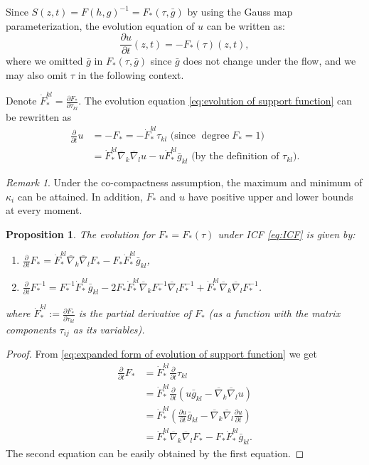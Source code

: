 \documentclass[reqno]{amsart}
\newtheorem{proposition}[theorem]{Proposition}
\theoremstyle{remark}
\newtheorem{remark}[theorem]{Remark}
\newcommand{\pd}[2]{\frac{\partial {#1}}{\partial {#2}}}
\newcommand{\bnabla}{\overline{\nabla}}
\newcommand{\bg}{\bar{g}}
\theoremstyle{definition}
\numberwithin{equation}{section}
\begin{document}
Since \(S(z,t) = F(h,g)^{-1} = F_{*}(\tau, \bg)\) by using the Gauss map parameterization, the evolution equation of \(u\) can be written as: 
\begin{equation}\label{eq:evolution of support function}
    \pd{u}{t}(z,t) = -F_{*}(\tau)(z,t),
\end{equation}
where we omitted \(\bg\) in \(F_*(\tau, \bg)\) since \(\bg\) does not change under the flow, and we may also omit \(\tau\) in the following context. 
\par Denote \(\dot{F}_*^{kl} = \pd{F_*}{\tau_{kl}}\). The evolution equation \eqref{eq:evolution of support function} can be rewritten as
\begin{equation}\label{eq:expanded form of evolution of support function}
    \begin{aligned}
        \pd{}{t}u &=-F_* = -\dot{F}_*^{kl}\tau_{kl}\text{ (since \(\operatorname{degree}F_* = 1\)) } \\
        &= \dot{F}_*^{kl}\bnabla_k \bnabla_l u - u\dot{F}_*^{kl}\bg_{kl}\text{ (by the definition of \(\tau_{kl}\))}.
    \end{aligned}
\end{equation}
\begin{remark}\label{rem:induced functions}
    Under the co-compactness assumption, the maximum and minimum of \(\kappa_i\) can be attained. In addition, \(F_*\) and \(u\) have positive upper and lower bounds at every moment. 
\end{remark}
\begin{proposition}\label{prop:evolution of speed}
    The evolution for $F_* = F_*(\tau)$ under ICF \eqref{eq:ICF} is given by: 
    \begin{enumerate}[label=(\arabic*)]
        \item $\displaystyle \pd{}{t}F_{*} = \dot{F}_*^{kl}\bnabla_k \bnabla_l F_* - F_* \dot{F}_*^{kl}{\bg}_{kl}$,
        \item $\displaystyle \pd{}{t}F_{*}^{-1} = F_*^{-1} \dot{F}_*^{kl}\bg_{kl} - 2F_* \dot{F}_*^{kl}\bnabla_k F_*^{-1}\bnabla_l F_*^{-1} + \dot{F}_*^{kl}\bnabla_k \bnabla_l F_*^{-1} $.
    \end{enumerate}
    where \(\dot{F}_*^{kl}:= \pd{F_*}{\tau_{kl}}\) is the partial derivative of \(F_*\) (as a function with the matrix components \(\tau_{ij}\) as its variables).  
\end{proposition}
\begin{proof}
    From \eqref{eq:expanded form of evolution of support function} we get 
    \[ \begin{aligned}
        \pd{}{t}F_* &= \dot{F}_*^{kl}\pd{}{t}\tau_{kl} \\
        &= \dot{F}_*^{kl}\pd{}{t}\left( u\bg_{kl} - \bnabla_k\bnabla_l u \right) \\
        &= \dot{F}_*^{kl}\left(\pd{u}{t}\bg_{kl} - \bnabla_k \bnabla_l \pd{u}{t}\right) \\
        &= \dot{F}_*^{kl}\bnabla_k \bnabla_l F_* - F_* \dot{F}_*^{kl}\bg_{kl}.
    \end{aligned}  \]
    The second equation can be easily obtained by the first equation.
\end{proof}
\end{document}
